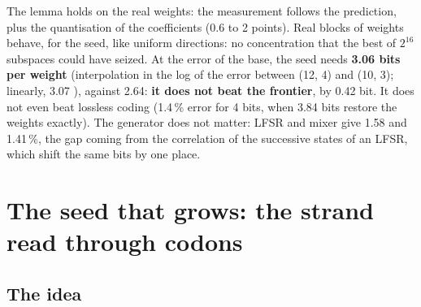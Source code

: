 The lemma holds on the real weights: the measurement follows the prediction, plus the quantisation of the coefficients (0.6 to 2 points). Real blocks of weights behave, for the seed, like uniform directions: no concentration that the best of $2^{16}$ subspaces could have seized. At the error of the base, the seed needs \textbf{3.06 bits per weight} (interpolation in the log of the error between (12, 4) and (10, 3); linearly, 3.07 \calc), against 2.64: \textbf{it does not beat the frontier}, by 0.42 bit. It does not even beat lossless coding (1.4\,\% error for 4 bits, when 3.84 bits restore the weights exactly). The generator does not matter: LFSR and mixer give 1.58 and 1.41\,\%, the gap coming from the correlation of the successive states of an LFSR, which shift the same bits by one place.

\section{The seed that grows: the strand read through codons}\label{t3gen:sec:brin}

\subsection{The idea}

